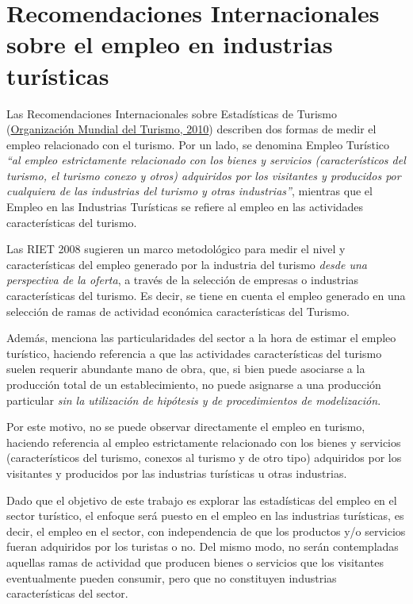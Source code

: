 \documentclass[
  openany]{book}
\begin{document}
\hypertarget{recomendaciones-internacionales-sobre-el-empleo-en-industrias-turuxedsticas}{%
\section{Recomendaciones Internacionales sobre el empleo en industrias turísticas}\label{recomendaciones-internacionales-sobre-el-empleo-en-industrias-turuxedsticas}}

Las Recomendaciones Internacionales sobre Estadísticas de Turismo (\protect\hyperlink{ref-riet2008}{Organización Mundial del Turismo, 2010}) describen dos formas de medir el empleo relacionado con el turismo. Por un lado, se denomina Empleo Turístico \emph{``al empleo estrictamente relacionado con los bienes y servicios (característicos del turismo, el turismo conexo y otros) adquiridos por los visitantes y producidos por cualquiera de las industrias del turismo y otras industrias''}, mientras que el Empleo en las Industrias Turísticas se refiere al empleo en las actividades características del turismo.

Las RIET 2008 sugieren un marco metodológico para medir el nivel y características del empleo generado por la industria del turismo \emph{desde una perspectiva de la oferta}, a través de la selección de empresas o industrias características del turismo. Es decir, se tiene en cuenta el empleo generado en una selección de ramas de actividad económica características del Turismo.

Además, menciona las particularidades del sector a la hora de estimar el empleo turístico, haciendo referencia a que las actividades características del turismo suelen requerir abundante mano de obra, que, si bien puede asociarse a la producción total de un establecimiento, no puede asignarse a una producción particular \emph{sin la utilización de hipótesis y de procedimientos de modelización}.

Por este motivo, no se puede observar directamente el empleo en turismo, haciendo referencia al empleo estrictamente relacionado con los bienes y servicios (característicos del turismo, conexos al turismo y de otro tipo) adquiridos por los visitantes y producidos por las industrias turísticas u otras industrias.

Dado que el objetivo de este trabajo es explorar las estadísticas del empleo en el sector turístico, el enfoque será puesto en el empleo en las industrias turísticas, es decir, el empleo en el sector, con independencia de que los productos y/o servicios fueran adquiridos por los turistas o no. Del mismo modo, no serán contempladas aquellas ramas de actividad que producen bienes o servicios que los visitantes eventualmente pueden consumir, pero que no constituyen industrias características del sector.
\end{document}
